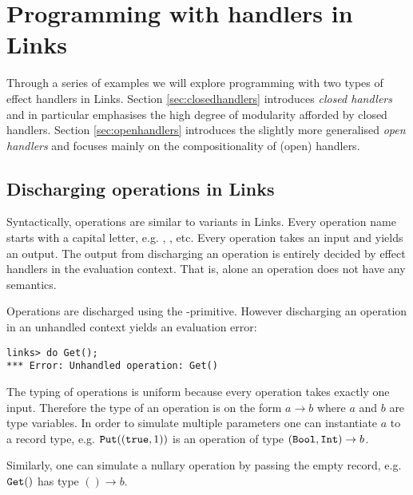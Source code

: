 \chapter{Programming with handlers in Links}\label{ch:programming-with-handlers}
Through a series of examples we will explore programming with two types of effect handlers in Links. Section \ref{sec:closedhandlers} introduces \emph{closed handlers} and in particular emphasises the high degree of modularity afforded by closed handlers. Section \ref{sec:openhandlers} introduces the slightly more generalised \emph{open handlers} and focuses mainly on the compositionality of (open) handlers.

\section{Discharging operations in Links}\label{sec:discharge}
Syntactically, operations are similar to variants in Links. Every operation name starts with a capital letter, e.g. , , etc. Every operation takes an input and yields an output. The output from discharging an operation is entirely decided by effect handlers in the evaluation context. That is, alone an operation does not have any semantics.

Operations are discharged using the -primitive. However discharging an operation in an unhandled context yields an evaluation error:
\begin{lstlisting}[style=links]
links> do Get();
*** Error: Unhandled operation: Get()
\end{lstlisting}
The typing of operations is uniform because every operation takes exactly one input. Therefore the type of an operation is on the form $a \to b$ where $a$ and $b$ are type variables. In order to simulate multiple parameters one can instantiate $a$ to a record type, e.g. $\texttt{Put}((\texttt{true},1))$ is an operation of type $(\texttt{Bool},\texttt{Int}) \to b$.

Similarly, one can simulate a nullary operation by passing the empty record, e.g. $\texttt{Get}()$ has type $() \to b$.

